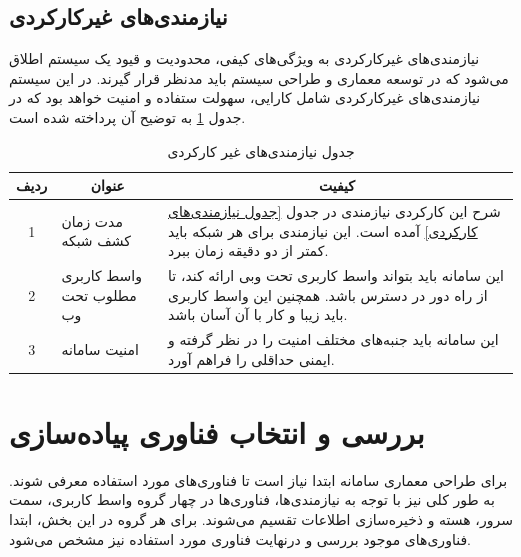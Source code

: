 \subsection{نیازمندی‌های غیرکارکردی}

نیازمندی‌های غیرکارکردی به ویژگی‌های کیفی، محدودیت و قیود یک سیستم اطلاق می‌شود که در توسعه معماری و طراحی سیستم باید مدنظر قرار گیرند\cite{bass2003software}. در این سیستم نیازمندی‌های غیرکارکردی شامل کارایی، سهولت ستفاده و امنیت خواهد بود که در جدول \ref{جدول نیازمندی‌های غیر کارکردی} به توضیح آن پرداخته شده است.

\begin{table}[h!]
    \centering
    \caption{جدول نیازمندی‌های غیر کارکردی}
    \label{جدول نیازمندی‌های غیر کارکردی}
    \begin{tabular}{| p{1cm} p{5cm} p{8cm} |} \toprule
        \multicolumn{1}{|c|}{ردیف} & \multicolumn{1}{c}{عنوان} & \multicolumn{1}{c|}{کیفیت} \\ \midrule
        \multicolumn{1}{|c|}{1}  & {مدت زمان کشف شبکه}  & {شرح این کارکردی نیازمندی در جدول \ref{جدول نیازمندی‌های کارکردی} آمده است. این نیازمندی برای هر شبکه باید کمتر از دو دقیقه زمان ببرد.} \\ \midrule
        \multicolumn{1}{|c|}{2}  & {واسط کاربری مطلوب تحت وب}  & {این سامانه باید بتواند واسط کاربری تحت وبی ارائه کند، تا از راه دور در دسترس باشد. همچنین این واسط کاربری باید زیبا و کار با آن آسان باشد.} \\ \midrule
        \multicolumn{1}{|c|}{3}  & {امنیت سامانه}  & {این سامانه باید جنبه‌های مختلف امنیت را در نظر گرفته و ایمنی حداقلی را فراهم آورد.} \\ \midrule
    \end{tabular}
\end{table}



\cleardoublepage




\section{بررسی و انتخاب فناوری پیاده‌سازی}

برای طراحی معماری سامانه ابتدا نیاز است تا فناوری‌های مورد استفاده معرفی شوند. به طور کلی نیز با توجه به نیازمندی‌ها، فناوری‌ها در چهار گروه واسط کاربری، سمت سرور، هسته  و ذخیره‌سازی اطلاعات تقسیم می‌شوند. برای هر گروه در این بخش، ابتدا فناوری‌های موجود بررسی و درنهایت فناوری مورد استفاده نیز مشخص می‌شود.

